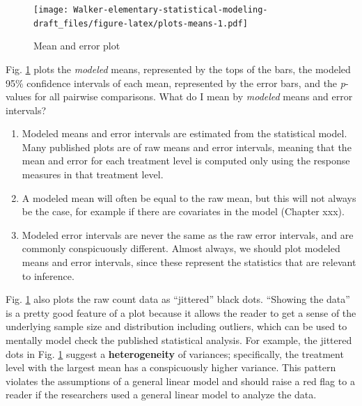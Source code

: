 \documentclass[]{book}
\providecommand{\tightlist}{%
  \setlength{\itemsep}{0pt}\setlength{\parskip}{0pt}}
\begin{document}
\begin{figure}
\centering
\texttt{[image: Walker-elementary-statistical-modeling-draft\_files/figure-latex/plots-means-1.pdf]}
\caption{\label{fig:plots-means}Mean and error plot}
\end{figure}

Fig. \ref{fig:plots-means} plots the \emph{modeled} means, represented by the tops of the bars, the modeled 95\% confidence intervals of each mean, represented by the error bars, and the \emph{p}-values for all pairwise comparisons. What do I mean by \emph{modeled} means and error intervals?

\begin{enumerate}
\def\labelenumi{\arabic{enumi}.}
\tightlist
\item
  Modeled means and error intervals are estimated from the statistical model. Many published plots are of raw means and error intervals, meaning that the mean and error for each treatment level is computed only using the response measures in that treatment level.
\item
  A modeled mean will often be equal to the raw mean, but this will not always be the case, for example if there are covariates in the model (Chapter xxx).
\item
  Modeled error intervals are never the same as the raw error intervals, and are commonly conspicuously different. Almost always, we should plot modeled means and error intervals, since these represent the statistics that are relevant to inference.
\end{enumerate}

Fig. \ref{fig:plots-means} also plots the raw count data as ``jittered'' black dots. ``Showing the data'' is a pretty good feature of a plot because it allows the reader to get a sense of the underlying sample size and distribution including outliers, which can be used to mentally model check the published statistical analysis. For example, the jittered dots in Fig. \ref{fig:plots-means} suggest a \textbf{heterogeneity} of variances; specifically, the treatment level with the largest mean has a conspicuously higher variance. This pattern violates the assumptions of a general linear model and should raise a red flag to a reader if the researchers used a general linear model to analyze the data.
\end{document}
